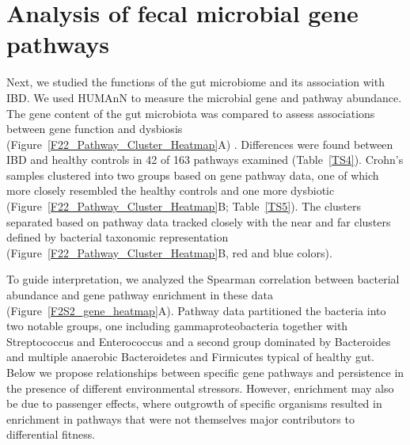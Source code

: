 \section{Analysis of fecal microbial gene pathways}
Next, we studied the functions of the gut microbiome and its association with IBD. We used HUMAnN  \citep{Abubucker:2012fd} to measure the microbial gene and pathway abundance. The gene content of the gut microbiota was compared to assess associations between gene function and dysbiosis (Figure~\ref{F22_Pathway_Cluster_Heatmap}A) . Differences were found between IBD and healthy controls in 42 of 163 pathways examined (Table~\ref{TS4}). Crohn's samples clustered into two groups based on gene pathway data, one of which more closely resembled the healthy controls and one more dysbiotic (Figure~\ref{F22_Pathway_Cluster_Heatmap}B; Table~\ref{TS5}). The clusters separated based on pathway data tracked closely with the near and far clusters defined by bacterial taxonomic representation (Figure~\ref{F22_Pathway_Cluster_Heatmap}B, red and blue colors). 

To guide interpretation, we analyzed the Spearman correlation between bacterial abundance and gene pathway enrichment in these data (Figure~\ref{F2S2_gene_heatmap}A). Pathway data partitioned the bacteria into two notable groups, one including gammaproteobacteria together with Streptococcus and Enterococcus and a second group dominated by Bacteroides and multiple anaerobic Bacteroidetes and Firmicutes typical of healthy gut. Below we propose relationships between specific gene pathways and persistence in the presence of different environmental stressors. However, enrichment may also be due to passenger effects, where outgrowth of specific organisms resulted in enrichment in pathways that were not themselves major contributors to differential fitness. 

